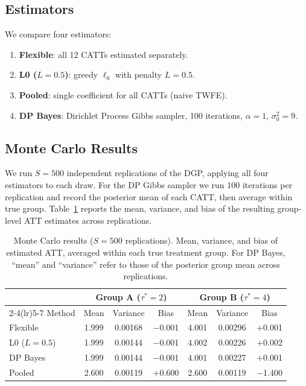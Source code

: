 \documentclass[margin=3in, 12pt]{article}
\newcommand{\1}{\mathbbm{1}}
\begin{document}
\subsection{Estimators}

We compare four estimators:
\begin{enumerate}[nosep]
  \item \textbf{Flexible}: all 12 CATTs estimated separately.
  \item \textbf{L0 ($L=0.5$)}: greedy $\ell_0$ with penalty $L=0.5$.
  \item \textbf{Pooled}: single coefficient for all CATTs (naive TWFE).
  \item \textbf{DP Bayes}: Dirichlet Process Gibbs sampler, 100 iterations,
    $\alpha = 1$, $\sigma_0^2 = 9$.
\end{enumerate}

\subsection{Monte Carlo Results}

We run $S = 500$ independent replications of the DGP, applying all four
estimators to each draw. For the DP Gibbs sampler we run 100 iterations per
replication and record the posterior mean of each CATT, then average within
true group. Table~\ref{tab:mc} reports the mean, variance, and bias of the
resulting group-level ATT estimates across replications.

\begin{table}[ht]
  \centering
  \caption{Monte Carlo results ($S=500$ replications). Mean, variance,
    and bias of estimated ATT, averaged within each true treatment group.
    For DP Bayes, ``mean'' and ``variance'' refer to those of the
    posterior group mean across replications.}
  \label{tab:mc}
  \begin{tabular}{lcccccc}
    \toprule
    & \multicolumn{3}{c}{Group A ($\tau^*=2$)}
    & \multicolumn{3}{c}{Group B ($\tau^*=4$)} \\
    \cmidrule(lr){2-4}\cmidrule(lr){5-7}
    Method & Mean & Variance & Bias & Mean & Variance & Bias \\
    \midrule
    Flexible     & 1.999 & 0.00168 & $-$0.001 & 4.001 & 0.00296 & $+$0.001 \\
    L0 ($L=0.5$) & 1.999 & 0.00144 & $-$0.001 & 4.002 & 0.00226 & $+$0.002 \\
    DP Bayes     & 1.999 & 0.00144 & $-$0.001 & 4.001 & 0.00227 & $+$0.001 \\
    Pooled       & 2.600 & 0.00119 & $+$0.600 & 2.600 & 0.00119 & $-$1.400 \\
    \bottomrule
  \end{tabular}
\end{table}
\end{document}
